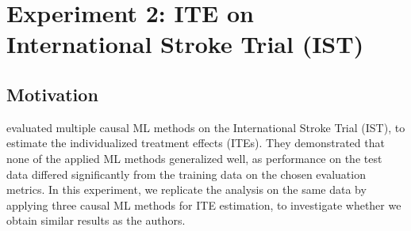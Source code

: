 % 
% 
% 














\section{Experiment 2: ITE on International Stroke Trial (IST)} \label{ch:exp2}





\subsection{Motivation}





% 
% 
\citet{chen2025} evaluated multiple causal ML methods on the International Stroke Trial (IST), to estimate the individualized treatment effects (ITEs). They demonstrated that none of the applied ML methods generalized well, as performance on the test data differed significantly from the training data on the chosen evaluation metrics.
In this experiment, we replicate the analysis on the same data by applying three causal ML methods for ITE estimation, to investigate whether we obtain similar results as the authors.


